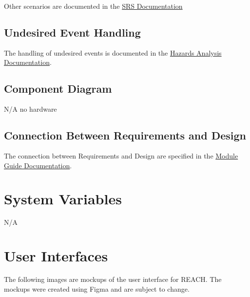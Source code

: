 \documentclass[12pt, titlepage]{article}
\begin{document}
\noindent
Other scenarios are documented in the \href{https://github.com/davimang/REACH/blob/main/docs/SRS/SRS.pdf}{SRS Documentation}

\subsection{Undesired Event Handling}

The handling of undesired events is documented in the \href{https://github.com/davimang/REACH/blob/main/docs/HazardAnalysis/HazardAnalysis.pdf}{Hazards Analysis Documentation}.

\subsection{Component Diagram}

N/A no hardware

\subsection{Connection Between Requirements and Design} \label{SecConnection}

The connection between Requirements and Design are specified in the \href{https://github.com/davimang/REACH/blob/main/docs/Design/SoftArchitecture/MG.pdf}{Module Guide Documentation}.

\section{System Variables}

N/A

\section{User Interfaces}


The following images are mockups of the user interface for REACH. 
The mockups were created using Figma and are subject to change.
\end{document}
